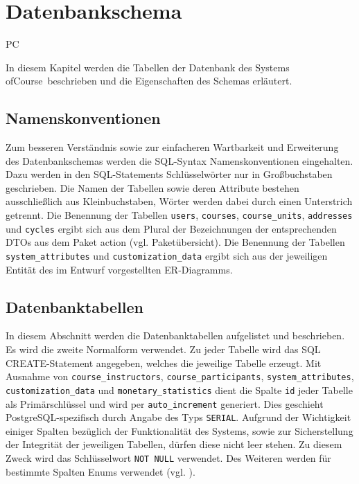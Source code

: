 \chapter{Datenbankschema}

\begin{tiny}
PC
\end{tiny}

In diesem Kapitel werden die Tabellen der Datenbank des Systems \grqq ofCourse\grqq\ beschrieben und die Eigenschaften des Schemas erläutert.

\section{Namenskonventionen}
Zum besseren Verständnis sowie zur einfacheren Wartbarkeit und Erweiterung des Datenbankschemas werden die SQL-Syntax Namenskonventionen eingehalten. Dazu werden in den SQL-Statements Schlüsselwörter nur in Großbuchstaben geschrieben. Die Namen der Tabellen sowie deren Attribute bestehen ausschließlich aus Kleinbuchstaben, Wörter werden dabei durch einen Unterstrich getrennt. Die Benennung der Tabellen \texttt{users}, \texttt{courses}, \texttt{course\_units}, \texttt{addresses} und \texttt{cycles} ergibt sich aus dem Plural der Bezeichnungen der entsprechenden DTOs aus dem Paket action (vgl. Paketübersicht). Die Benennung der Tabellen \texttt{system\_attributes} und \texttt{customization\_data} ergibt sich aus der jeweiligen Entität des im Entwurf vorgestellten ER-Diagramms.

\section{Datenbanktabellen}
In diesem Abschnitt werden die Datenbanktabellen aufgelistet und beschrieben. Es wird die zweite Normalform verwendet. Zu jeder Tabelle wird das SQL CREATE-Statement angegeben, welches die jeweilige Tabelle erzeugt. Mit Ausnahme von \texttt{course_instructors}, \texttt{course_participants}, \texttt{system\_attributes}, \texttt{customization\_data} und \texttt{monetary\_statistics} dient die Spalte \texttt{id} jeder Tabelle als Primärschlüssel und wird per \texttt{auto\_increment} generiert. Dies geschieht PostgreSQL-spezifisch durch Angabe des Typs \texttt{SERIAL}. Aufgrund der Wichtigkeit einiger Spalten bezüglich der Funktionalität des Systems, sowie zur Sicherstellung der Integrität der jeweiligen Tabellen, dürfen diese nicht leer stehen. Zu diesem Zweck wird das Schlüsselwort \texttt{NOT NULL} verwendet. Des Weiteren werden für bestimmte Spalten Enums verwendet (vgl. ).

